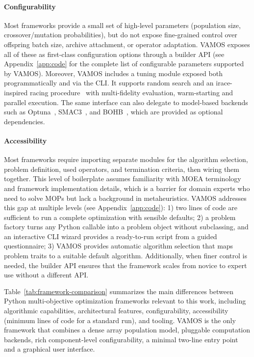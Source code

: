 \documentclass[journal]{IEEEtran}
\newcommand{\VAMOS}{VAMOS}
\begin{document}
\paragraph{Configurability} Most frameworks provide a small set of high-level parameters (population size, crossover/mutation probabilities), but do not expose fine-grained control over offspring batch size, archive attachment, or operator adaptation. VAMOS exposes all of these as first-class configuration options through a builder API (see Appendix~\ref{app:code} for the complete list of configurable parameters supported by VAMOS). Moreover, VAMOS includes a tuning module exposed both programmatically and via the CLI. It supports random search and an irace-inspired racing procedure~\cite{LDP+16} with multi-fidelity evaluation, warm-starting and parallel execution. The same interface can also delegate to model-based backends such as Optuna~\cite{ASY+19}, SMAC3~\cite{LEF+22}, and BOHB~\cite{FKH18}, which are provided as optional dependencies.

\paragraph{Accessibility} Most frameworks require importing separate modules for the algorithm selection, problem definition, used operators, and termination criteria, then wiring them together. This level of boilerplate assumes familiarity with MOEA terminology and framework implementation details, which is a barrier for domain experts who need to solve MOPs but lack a background in metaheuristics. VAMOS addresses this gap at multiple levels (see Appendix~\ref{app:code}): 1) two lines of code are sufficient to run a complete optimization with sensible defaults; 2) a problem factory turns any Python callable into a problem object without subclassing, and an interactive CLI wizard provides a ready-to-run script from a guided questionnaire; 3) VAMOS provides automatic algorithm selection that maps problem traits to a suitable default algorithm. Additionally, when finer control is needed, the builder API ensures that the framework scales from novice to expert use without a different API.

Table~\ref{tab:framework-comparison} summarizes the main differences between Python multi-objective optimization frameworks relevant to this work, including algorithmic capabilities, architectural features, configurability, accessibility (minimum lines of code for a standard run), and tooling. \VAMOS{} is the only framework that combines a dense array population model, pluggable computation backends, rich component-level configurability, a minimal two-line entry point and a graphical user interface.
\end{document}
